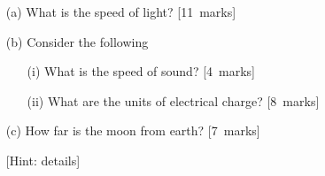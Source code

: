 \begin{itemize}
\item[(a)]
What is the speed of light?
[11~marks]

\item[(b)]
Consider the following
\begin{itemize}
\item[(i)]
What is the speed of sound?
[4~marks]
\item[(ii)] What are the units of electrical charge?
[8~marks]
\end{itemize}

\item[(c)]
How far is the moon from earth?
[7~marks]

\begin{center}
[Hint: details]
\end{center}
\end{itemize}
